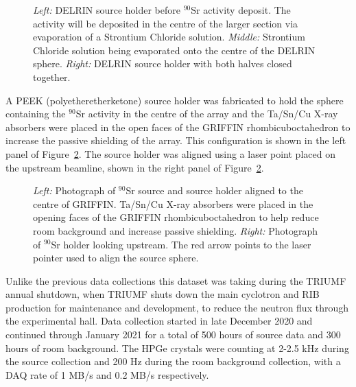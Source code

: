 \documentclass[cnatzke_thesis_proposal.tex]{subfiles}
\begin{document}

\begin{figure}[htbp]
  \centering
  \quad
  \quad
  \caption{
    \textit{Left:} DELRIN source holder before $^{90}$Sr activity deposit. The activity will be deposited in the centre of the larger section via evaporation of a Strontium Chloride solution.
    \textit{Middle:} Strontium Chloride solution being evaporated onto the centre of the DELRIN sphere.
    \textit{Right:} DELRIN source holder with both halves closed together.
  }
  \label{fig:source_holder}
\end{figure}

A PEEK (polyetheretherketone) source holder was fabricated to hold the sphere containing the $^{90}$Sr activity in the centre of the array and the Ta/Sn/Cu X-ray absorbers were placed in the open faces of the GRIFFIN rhombicuboctahedron to increase the passive shielding of the array. This configuration is shown in the left panel of Figure~\ref{fig:source_holder_in_griffin}. The source holder was aligned using a laser point placed on the upstream beamline, shown in the right panel of Figure~\ref{fig:source_holder_in_griffin}.

\begin{figure}[htbp]
  \centering
  \quad
  \caption{
    \textit{Left:} Photograph of $^{90}$Sr source and source holder aligned to the centre of GRIFFIN. Ta/Sn/Cu X-ray absorbers were placed in the opening faces of the GRIFFIN rhombicuboctahedron to help reduce room background and increase passive shielding.
    \textit{Right:} Photograph of $^{90}$Sr holder looking upstream. The red arrow points to the laser pointer used to align the source sphere.
  }
  \label{fig:source_holder_in_griffin}
\end{figure}

Unlike the previous data collections this dataset was taking during the TRIUMF annual shutdown, when TRIUMF shuts down the main cyclotron and RIB production for maintenance and development, to reduce the neutron flux through the experimental hall. Data collection started in late December 2020 and continued through January 2021 for a total of 500 hours of source data and 300 hours of room background. The HPGe crystals were counting at 2-2.5 kHz during the source collection and 200 Hz during the room background collection, with a DAQ rate of 1 MB/s and 0.2 MB/s respectively.
\end{document}
